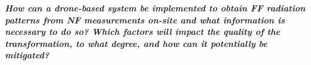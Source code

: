 \begin{center}
    \textbf{\textit{How can a drone-based system be implemented to obtain \gls{FF} radiation patterns from \gls{NF} measurements on-site and what information is necessary to do so? Which factors will impact the quality of the transformation, to what degree, and how can it potentially be mitigated? }}
\end{center}

